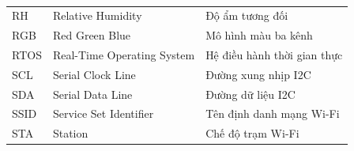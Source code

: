 \begin{table}[H]
\begin{tabular}{lll}
RH      & Relative Humidity                   & Độ ẩm tương đối \\
RGB     & Red Green Blue                      & Mô hình màu ba kênh \\
RTOS    & Real-Time Operating System          & Hệ điều hành thời gian thực \\
SCL     & Serial Clock Line                   & Đường xung nhịp I2C \\
SDA     & Serial Data Line                    & Đường dữ liệu I2C \\
SSID    & Service Set Identifier              & Tên định danh mạng Wi-Fi \\
STA     & Station                             & Chế độ trạm Wi-Fi \\
\bottomrule
\end{tabular}
\caption*{}
\end{table}
